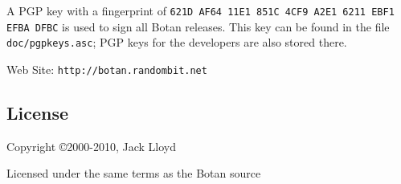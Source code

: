 \documentclass{article}
\newcommand{\filename}[1]{\texttt{#1}}
\newcommand{\url}[1]{\texttt{#1}}
\begin{document}
A PGP key with a fingerprint of
\verb|621D AF64 11E1 851C 4CF9 A2E1 6211 EBF1 EFBA DFBC| is used to sign all
Botan releases. This key can be found in the file \filename{doc/pgpkeys.asc};
PGP keys for the developers are also stored there.

\vskip 5pt \noindent
Web Site: \url{http://botan.randombit.net}

\subsection{License}

Copyright \copyright  2000-2010, Jack Lloyd

Licensed under the same terms as the Botan source
\end{document}
